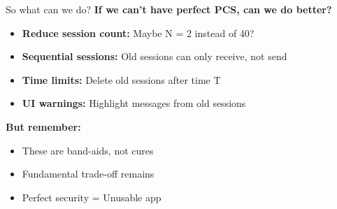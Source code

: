 \documentclass[aspectratio=169, lualatex, handout]{beamer}
\begin{document}
\begin{frame}{So what can we do?}
	\textbf{If we can't have perfect PCS, can we do better?}
	\begin{itemize}
		\item \textbf{Reduce session count:} Maybe N = 2 instead of 40?
		\item \textbf{Sequential sessions:} Old sessions can only receive, not send
		\item \textbf{Time limits:} Delete old sessions after time T
		\item \textbf{UI warnings:} Highlight messages from old sessions
	\end{itemize}
	\textbf{But remember:}
	\begin{itemize}
		\item These are band-aids, not cures
		\item Fundamental trade-off remains
		\item Perfect security = Unusable app
	\end{itemize}
\end{frame}
\end{document}
